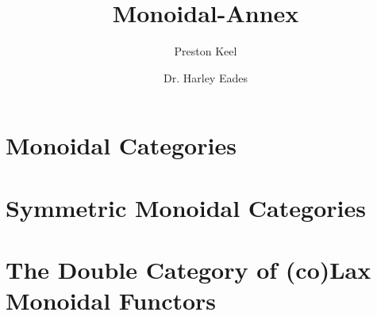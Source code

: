\documentclass[11pt]{article}
\title{Monoidal-Annex}
\author{Preston Keel \and Dr. Harley Eades}
\begin{document}
\maketitle
\tableofcontents

\section{Monoidal Categories}
\label{sec:monoidal_categories}


\section{Symmetric Monoidal Categories}
\label{sec:symmetric_monoidal_categories}


\section{The Double Category of (co)Lax Monoidal Functors}
\label{sec:the_double_category_of_colax_monoidal_functors}





\end{document}
